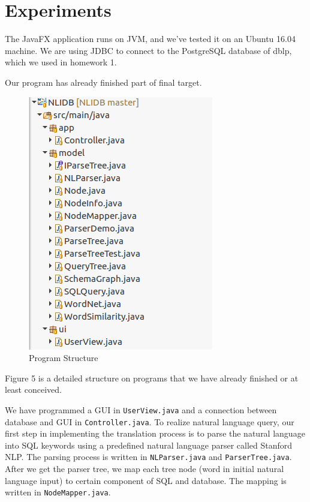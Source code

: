 \documentclass[twocolumn]{article}
\begin{document}
\section{Experiments}
The JavaFX application runs on JVM, and we’ve tested it on an Ubuntu 16.04 machine. We are using JDBC to connect to the PostgreSQL database of dblp, which we used in homework 1.

Our program has already finished part of final target. 

\begin{figure}[ht]
  \centering
  \includegraphics[width=0.8\linewidth]{figures/program_structure.png}
  \caption{Program Structure}
\end{figure}
  
Figure 5 is a detailed structure on programs that we have already finished or at least conceived.

We have programmed a GUI in \texttt{UserView.java} and a connection between database and GUI in \texttt{Controller.java}. To realize natural language query, our first step in implementing the translation process is to parse the natural language into SQL keywords using a predefined natural language parser called Stanford NLP. The parsing process is written in \texttt{NLParser.java} and \texttt{ParserTree.java}. After we get the parser tree, we map each tree node (word in initial natural language input) to certain component of SQL and database. The mapping is written in \texttt{NodeMapper.java}.
\end{document}
